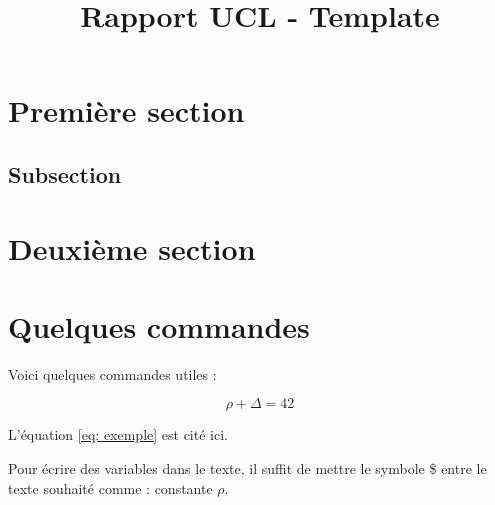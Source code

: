 \documentclass{rapport}
\title{Rapport UCL - Template} %
\begin{document}




        
\fairemarges %
\fairepagedegarde %
\tabledematieres %



\section{Première section} 

\lipsum[3-4]%

\subsection{Subsection}

\lipsum[3-4] %

\section{Deuxième section}

\lipsum[3-5] %


\section{Quelques commandes}

Voici quelques commandes utiles :


\begin{equation} \label{eq: exemple}
\rho + \Delta = 42
\end{equation}

L'équation \ref{eq: exemple} est cité ici. 


Pour écrire des variables dans le texte, il suffit de mettre le symbole \$ entre le texte souhaité comme : constante $\rho$. 




\end{document}
